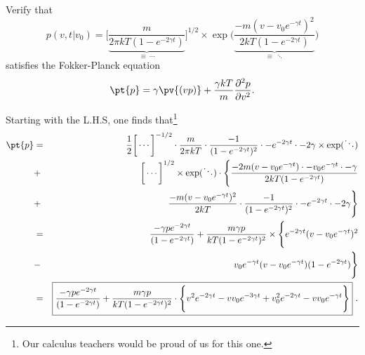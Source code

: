 
Verify that
\begin{equation}
p(v, t|v_0) = \bigg[\underbrace{\frac{m}{2\pi k T (1-e^{-2\gamma t})}}_{\equiv~\cdots}\bigg]^{1/2} \times \exp\bigg(\underbrace{\frac{-m(v-v_0 e^{-\gamma t})^2}{2 k T (1-e^{-2\gamma t})}}_{\equiv~ \ddots}\bigg)
\end{equation}
satisfies the Fokker-Planck equation
\begin{equation}
\pt{p} = \gamma \pv{(vp)} + \frac{\gamma k T}{m} \frac{\partial^2 p}{\partial v^2}.
\end{equation}

Starting with the L.H.S, one finds that\footnote{Our calculus teachers would be proud of us for this one.}
\begin{eqnarray}
\pt{p} &=& \frac{1}{2} \bigg[\cdots\bigg]^{-1/2} \cdot \frac{m}{2\pi k T} \cdot \frac{-1}{(1-e^{-2\gamma t})^2} \cdot -e^{-2\gamma t} \cdot -2\gamma \times \exp(\ddots) \nonumber \\
&+& \bigg[\cdots\bigg]^{1/2} \times \exp(\ddots) \cdot \Bigg\{ \frac{-2 m (v-v_0 e^{-\gamma t}) \cdot -v_0 e^{-\gamma t} \cdot -\gamma }{2 k T (1-e^{-2\gamma t})} \nonumber \\
&+& \frac{-m(v-v_0 e^{-\gamma t})^2}{2 k T} \cdot \frac{-1}{(1-e^{-2\gamma t})^2} \cdot -e^{-2\gamma t} \cdot -2 \gamma  \Bigg\} \nonumber \\
&=& \frac{-\gamma p e^{-2 \gamma t}}{(1-e^{-2 \gamma t})} 
+ \frac{m \gamma p}{kT(1-e^{-2\gamma t})^2} \times \Bigg\{ e^{-2 \gamma t} (v-v_0 e^{-\gamma t})^2 \nonumber \\
&-& v_0 e^{-\gamma t} (v-v_0 e^{-\gamma t}) (1-e^{-2 \gamma t})\Bigg\} \nonumber \\
&=& \boxed{ \frac{-\gamma p e^{-2 \gamma t}}{(1-e^{-2 \gamma t})} 
+ \frac{m \gamma p}{kT(1-e^{-2\gamma t})^2} \cdot  \Bigg\{  v^2 e^{-2\gamma t} - v v_0  e^{-3\gamma t} + v_0 ^2 e^{-2\gamma t} - v v_0 e^{-\gamma t} \Bigg\} }~. \nonumber
\end{eqnarray}

